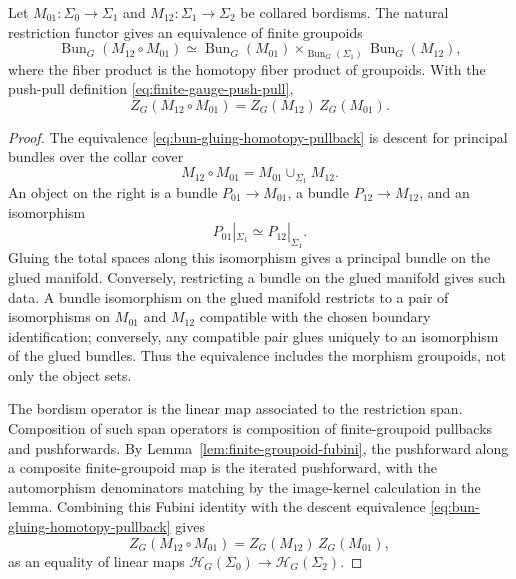 \begin{theorem}
\label{thm:finite-groupoid-gluing}
Let \(M_{01}:\Sigma_0\to\Sigma_1\) and
\(M_{12}:\Sigma_1\to\Sigma_2\) be collared bordisms.  The natural
restriction functor gives an equivalence of finite groupoids
\begin{equation}
  \operatorname{Bun}_G(M_{12}\circ M_{01})
  \simeq
  \operatorname{Bun}_G(M_{01})
  \times_{\operatorname{Bun}_G(\Sigma_1)}
  \operatorname{Bun}_G(M_{12}),
  \label{eq:bun-gluing-homotopy-pullback}
\end{equation}
where the fiber product is the homotopy fiber product of groupoids.  With
the push-pull definition \eqref{eq:finite-gauge-push-pull},
\begin{equation}
  Z_G(M_{12}\circ M_{01})
  =
  Z_G(M_{12})\,Z_G(M_{01}).
  \label{eq:finite-gauge-gluing}
\end{equation}
\end{theorem}

\begin{proof}
The equivalence \eqref{eq:bun-gluing-homotopy-pullback} is descent for
principal bundles over the collar cover
\[
  M_{12}\circ M_{01}=M_{01}\cup_{\Sigma_1}M_{12}.
\]
An object on the right is a bundle \(P_{01}\to M_{01}\), a bundle
\(P_{12}\to M_{12}\), and an isomorphism
\[
  P_{01}|_{\Sigma_1}\simeq P_{12}|_{\Sigma_1}.
\]
Gluing the total spaces along this isomorphism gives a principal bundle on
the glued manifold.  Conversely, restricting a bundle on the glued manifold
gives such data.  A bundle isomorphism on the glued manifold restricts to a
pair of isomorphisms on \(M_{01}\) and \(M_{12}\) compatible with the chosen
boundary identification; conversely, any compatible pair glues uniquely to an
isomorphism of the glued bundles.  Thus the equivalence includes the
morphism groupoids, not only the object sets.

The bordism operator is the linear map associated to the restriction span.
Composition of such span operators is composition of finite-groupoid
pullbacks and pushforwards.  By Lemma~\ref{lem:finite-groupoid-fubini}, the
pushforward along a composite finite-groupoid map is the iterated
pushforward, with the automorphism denominators matching by the
image-kernel calculation in the lemma.  Combining this Fubini identity with
the descent equivalence \eqref{eq:bun-gluing-homotopy-pullback} gives
\[
  Z_G(M_{12}\circ M_{01})
  =
  Z_G(M_{12})\,Z_G(M_{01}),
\]
as an equality of linear maps
\(\mathcal H_G(\Sigma_0)\to\mathcal H_G(\Sigma_2)\).
\end{proof}

